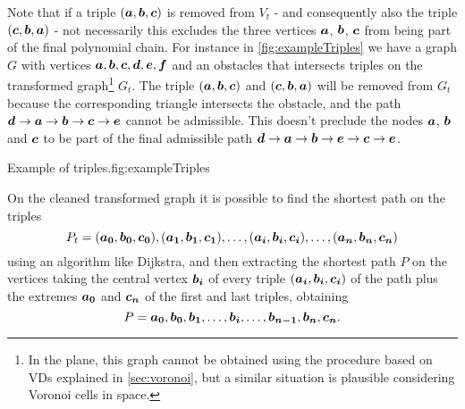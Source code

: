\documentclass[dissertation.tex]{subfiles}
\begin{document}
Note that if a triple $(\boldsymbol{a},\boldsymbol{b},\boldsymbol{c})$ is removed from $V_t$ - and
consequently also the triple $(\boldsymbol{c},\boldsymbol{b},\boldsymbol{a})$ - not
necessarily this excludes
the three vertices $\boldsymbol{a}$, $\boldsymbol{b}$, $\boldsymbol{c}$ from being part of the final
polynomial chain. For instance in
\cref{fig:exampleTriples} we have a graph $G$ with vertices
$\boldsymbol{a},\boldsymbol{b},\boldsymbol{c},\boldsymbol{d},\boldsymbol{e},\boldsymbol{f}$ and an obstacles that
intersects triples on the transformed graph\footnote{In the plane, this graph cannot be
  obtained using the procedure based on \acp{VD} explained in
  \cref{sec:voronoi}, but a similar situation is plausible
  considering Voronoi cells in space.} $G_t$. The triple
$(\boldsymbol{a},\boldsymbol{b},\boldsymbol{c})$ and $(\boldsymbol{c},\boldsymbol{b},\boldsymbol{a})$ will be removed from $G_t$ because
the corresponding triangle intersects the obstacle, and the path
$\boldsymbol{d}\rightarrow \boldsymbol{a}\rightarrow \boldsymbol{b}\rightarrow \boldsymbol{c}\rightarrow \boldsymbol{e}$ cannot be
admissible. This doesn't preclude the nodes $\boldsymbol{a}$, $\boldsymbol{b}$ and $\boldsymbol{c}$ to be part
of the final admissible path $\boldsymbol{d}\rightarrow \boldsymbol{a}\rightarrow \boldsymbol{b}\rightarrow \boldsymbol{e}\rightarrow \boldsymbol{c}\rightarrow \boldsymbol{e}$.
\begin{myfig}{Example of triples.}{fig:exampleTriples}
\end{myfig}

On the cleaned transformed graph it is possible to find the shortest
path on the triples
$$
P_t=(\boldsymbol{a_0},\boldsymbol{b_0},\boldsymbol{c_0}), (\boldsymbol{a_1},\boldsymbol{b_1},\boldsymbol{c_1}),\dots,(\boldsymbol{a_i},\boldsymbol{b_i},\boldsymbol{c_i}),\dots,(\boldsymbol{a_n},\boldsymbol{b_n},\boldsymbol{c_n})
$$
 using
an algorithm like Dijkstra, and then extracting the shortest
path $P$ on the vertices taking the central vertex $\boldsymbol{b_i}$ of every
triple $(\boldsymbol{a_i},\boldsymbol{b_i},\boldsymbol{c_i})$ of the path plus the extremes $\boldsymbol{a_0}$ and $\boldsymbol{c_n}$
of the first and last triples, obtaining
$$
P=\boldsymbol{a_0},\boldsymbol{b_0},\boldsymbol{b_1},\dots,\boldsymbol{b_i},\dots,\boldsymbol{b_{n-1}},\boldsymbol{b_n},\boldsymbol{c_n}.
$$
\end{document}
